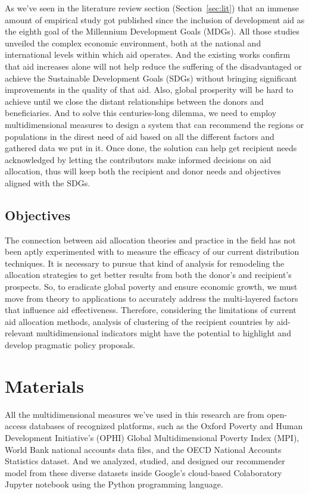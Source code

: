 \documentclass{swfuthesise}
\begin{document}
As we've seen in the literature review section (Section~\ref{sec:lit}) that an immense amount
of empirical study got published since the inclusion of development aid as the eighth goal
of the Millennium Development Goals (MDGs). All those studies unveiled the complex
economic environment, both at the national and international levels within which aid
operates. And the existing works confirm that aid increases alone will not help reduce the
suffering of the disadvantaged or achieve the Sustainable Development Goals (SDGs) without
bringing significant improvements in the quality of that aid. Also, global prosperity will
be hard to achieve until we close the distant relationships between the donors and
beneficiaries. And to solve this centuries-long dilemma, we need to employ
multidimensional measures to design a system that can recommend the regions or populations
in the direst need of aid based on all the different factors and gathered data we put in
it. Once done, the solution can help get recipient needs acknowledged by letting the contributors make informed decisions on aid allocation, thus will keep both the recipient and donor needs and objectives aligned with the SDGs.

\section{Objectives}

The connection between aid allocation theories and practice in the field has not been aptly experimented with to measure the efficacy of our current distribution techniques. It is necessary to pursue that kind of analysis for remodeling the allocation strategies to get better results from both the donor's and recipient's prospects. So, to eradicate global poverty and ensure economic growth, we must move from theory to applications to accurately address the multi-layered factors that influence aid effectiveness. Therefore, considering the limitations of current aid allocation methods, analysis of clustering of the recipient countries by aid-relevant multidimensional indicators might have the potential to highlight and develop pragmatic policy proposals.

\chapter{Materials}

All the multidimensional measures we’ve used in this research are from open-access databases of recognized platforms, such as the Oxford Poverty and Human Development Initiative's (OPHI) Global Multidimensional Poverty Index (MPI), World Bank national accounts data files, and the OECD National Accounts Statistics dataset. And we analyzed, studied, and designed our recommender model from these diverse datasets inside Google's cloud-based Colaboratory Jupyter notebook using the Python programming language.
\end{document}
